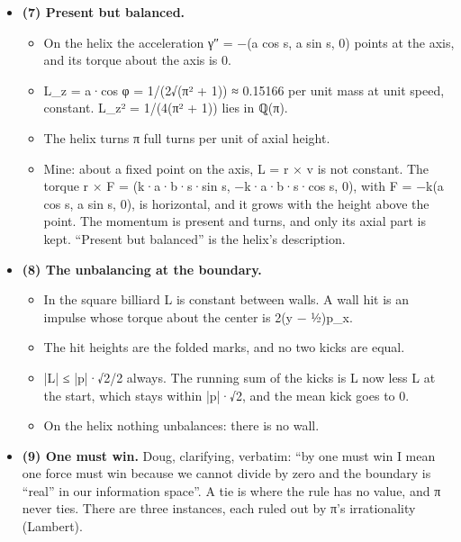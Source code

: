 \begin{itemize}
\begin{itemize}
\item A shifted start slides the whole etch rigidly: an isometry, Lyapunov exponent 0, ε stays ε, and the three gaps are the same. The rotation is uniquely ergodic (Weyl; Walters): every start has the same long-run statistics. “The field starting conditions do not matter” holds, and “perturb it differently every time” is the shift.
\item A changed magnitude, with the direction constant, is Doug's wave (6). The rotations by α and by α + ε separate by nε after n encounters with the period 1: linearly, without end, and after about 1/ε encounters the two etches are unrelated. It is not chaos: the growth is linear, not exponential.
\item Every irrational magnitude etches its own never-repeating pattern. A rational one closes.
\end{itemize}
\item \textbf{(7) Present but balanced.}

\begin{itemize}
\item On the helix the acceleration γ″ = −(a cos s, a sin s, 0) points at the axis, and its torque about the axis is 0.
\item L\_\allowbreak{}z = a·cos φ = 1/(2√(π² + 1)) ≈ 0.15166 per unit mass at unit speed, constant. L\_\allowbreak{}z² = 1/(4(π² + 1)) lies in ℚ(π).
\item The helix turns π full turns per unit of axial height.
\item Mine: about a fixed point on the axis, L = r × v is not constant. The torque r × F = (k·a·b·s·sin s, −k·a·b·s·cos s, 0), with F = −k(a cos s, a sin s, 0), is horizontal, and it grows with the height above the point. The momentum is present and turns, and only its axial part is kept. “Present but balanced” is the helix's description.
\end{itemize}
\item \textbf{(8) The unbalancing at the boundary.}

\begin{itemize}
\item In the square billiard L is constant between walls. A wall hit is an impulse whose torque about the center is 2(y − ½)p\_\allowbreak{}x.
\item The hit heights are the folded marks, and no two kicks are equal.
\item |L| ≤ |p|·√2/2 always. The running sum of the kicks is L now less L at the start, which stays within |p|·√2, and the mean kick goes to 0.
\item On the helix nothing unbalances: there is no wall.
\end{itemize}
\item \textbf{(9) One must win.} Doug, clarifying, verbatim: “by one must win I mean one force must win because we cannot divide by zero and the boundary is “real” in our information space”. A tie is where the rule has no value, and π never ties. There are three instances, each ruled out by π's irrationality (Lambert).


\end{itemize}
